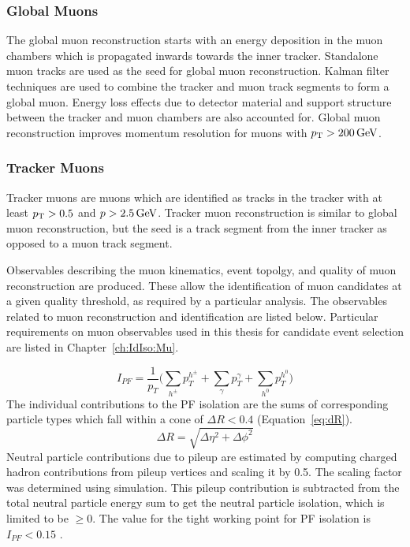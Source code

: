 \subsubsection{Global Muons}
The global muon reconstruction starts with an energy deposition in the muon chambers which is propagated inwards towards the inner tracker. Standalone muon tracks are used as the seed for global muon reconstruction. Kalman filter techniques are used to combine the tracker and muon track segments to form a global muon. Energy loss effects due to detector material and support structure between the tracker and muon chambers are also accounted for. Global muon reconstruction improves momentum resolution for muons with $p_{\mathrm{T}} > 200 \,\text{Ge\hspace{-.08em}V}$.

\subsubsection{Tracker Muons}
Tracker muons are muons which are identified as tracks in the tracker with at least $p_{\mathrm{T}} > 0.5$ and $p > 2.5\,\text{Ge\hspace{-.08em}V}$. Tracker muon reconstruction is similar to global muon reconstruction, but the seed is a track segment from the inner tracker as opposed to a muon track segment.

Observables describing the muon kinematics, event topolgy, and quality of muon reconstruction are produced. These allow the identification of muon candidates at a given quality threshold, as required by a particular analysis. The observables related to muon reconstruction and identification are listed below. Particular requirements on muon observables used in this thesis for candidate event selection are listed in Chapter~\ref{ch:IdIso:Mu}.  

\begin{equation}
    I_{PF} = \frac{1}{p_T} \Bigg(\sum_{h^{\pm}} p_T^{h^{\pm}} +\sum_{\gamma} p_T^{\gamma} + \sum_{h^{0}} p_T^{h^{0}}\Bigg)
    \label{ch:pfiso}
\end{equation}
The individual contributions to the PF isolation are the sums of corresponding particle types which fall within a cone of $\Delta R < 0.4$ (Equation~\ref{eq:dR}).
\begin{equation}
    \Delta R = \sqrt{\Delta\eta^2+\Delta\phi^2}
    \label{eq:dR}
\end{equation}
Neutral particle contributions due to pileup are estimated by computing charged hadron contributions from pileup vertices and scaling it by 0.5. The scaling factor was determined using simulation. This pileup contribution is subtracted from the total neutral particle energy sum to get the neutral particle isolation, which is limited to be $\geq0$.
The value for the tight working point for PF isolation is $I_{PF} < 0.15$ \cite{Sirunyan_2017}.



